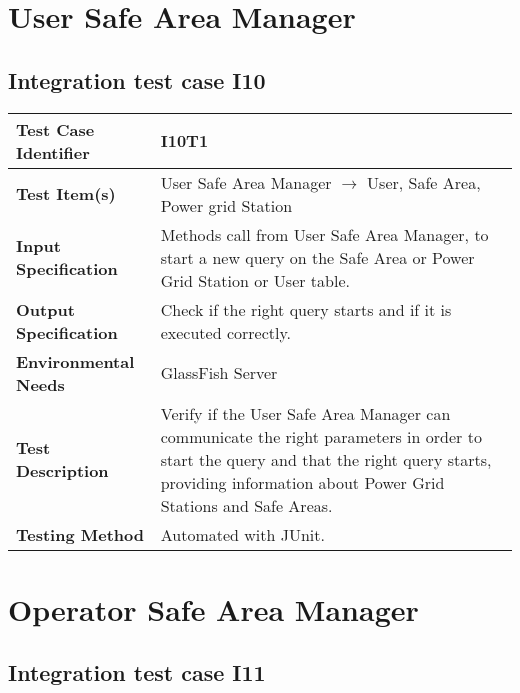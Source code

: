 \section{User Safe Area Manager}
\subsection{Integration test case I10}

\begin{tabular}{l p{}}
    \hline
    \textbf{Test Case Identifier} & I10T1\\
    \hline
    \textbf{Test Item(s)} & User Safe Area Manager $\rightarrow$ User, Safe Area, Power grid Station\\
    \hline
    \textbf{Input Specification} & Methods call from User Safe Area Manager, to start a new query on the Safe Area or Power Grid Station or User table.\\
    \hline
    \textbf{Output Specification} & Check if the right query starts and if it is executed correctly.\\
    \hline
    \textbf{Environmental Needs} &  GlassFish Server\\
    \hline
    \textbf{Test Description} & Verify if the User Safe Area Manager can communicate the right parameters in order to start the query and that the right query starts, providing information about Power Grid Stations and Safe Areas.\\
    \hline
    \textbf{Testing Method} & Automated with JUnit.\\
    \hline
\end{tabular}

\section{ Operator Safe Area Manager}
\subsection{Integration test case I11}

